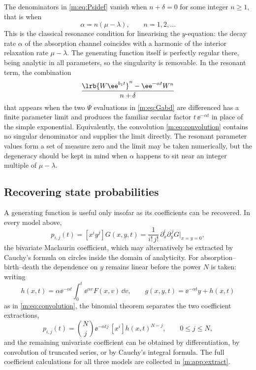 \begin{remark}[Resonance]
\label{m:rem:resonance}
The denominators in \cref{m:eq:Psidef} vanish when $n+\delta=0$ for some integer
$n\ge1$, that is when
\begin{equation*}
\alpha = n(\mu-\lambda),\qquad n=1,2,\dots
\end{equation*}
This is the classical resonance condition for linearising the $y$-equation: the
decay rate $\alpha$ of the absorption channel coincides with a harmonic of the
interior relaxation rate $\mu-\lambda$. The generating function itself is perfectly
regular there, being analytic in all parameters, so the singularity is removable.
In the resonant term, the combination
\begin{equation*}
\frac{\lrb{W\ee^{b_1t}}^{n} - \ee^{-\alpha t}W^n}{n+\delta}
\end{equation*}
that appears when the two $\Psi$ evaluations in \cref{m:eq:Gabd} are differenced
has a finite parameter limit and produces the familiar secular factor
$t\,\ee^{-\alpha t}$ in place of the simple exponential. Equivalently, the
convolution \cref{m:eq:convolution} contains no singular denominator and supplies
the limit directly. The resonant parameter values form a set of measure zero and
the limit may be taken numerically, but the degeneracy should be kept in mind when
$\alpha$ happens to sit near an integer multiple of $\mu-\lambda$.
\end{remark}

\subsection{Recovering state probabilities}
\label{m:sec:recovery}

A generating function is useful only insofar as its coefficients can be recovered.
In every model above,
\begin{equation}
\label{m:eq:bivariatecoeff}
p_{i,j}(t) = [x^iy^j]G(x,y,t)
= \frac{1}{i!\,j!}\,\partial_x^i\partial_y^{\,j}G\Big|_{x=y=0} ,
\end{equation}
the bivariate Maclaurin coefficient, which may alternatively be extracted by
Cauchy's formula on circles inside the domain of analyticity. For
absorption--birth--death the dependence on $y$ remains linear before the power $N$
is taken: writing
\begin{equation*}
h(x,t) = \alpha\ee^{-\alpha t}\int_0^t\ee^{\alpha v}F(x,v)\,\dd v,
\qquad
g(x,y,t) = \ee^{-\alpha t}y + h(x,t)
\end{equation*}
as in \cref{m:eq:convolution}, the binomial theorem separates the two coefficient
extractions,
\begin{equation}
\label{m:eq:abdcoeff}
p_{i,j}(t) = \binom{N}{j}\ee^{-\alpha tj}\,[x^i]h(x,t)^{N-j},
\qquad 0\le j\le N ,
\end{equation}
and the remaining univariate coefficient can be obtained by differentiation, by
convolution of truncated series, or by Cauchy's integral formula. The full
coefficient calculations for all three models are collected in
\cref{m:app:extract}.

\FloatBarrier
